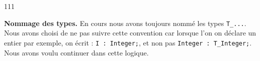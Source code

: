
\begin{dinglist}{111}
   \item \textbf{Nommage des types.} En cours nous avons toujours nommé les types \lstinline{T_...}. Nous avons choisi de ne pas suivre cette convention car lorsque l'on on déclare un entier par exemple, on écrit : \lstinline{I : Integer;}, et non pas \lstinline{Integer : T_Integer;}. Nous avons voulu continuer dans cette logique.
\end{dinglist}